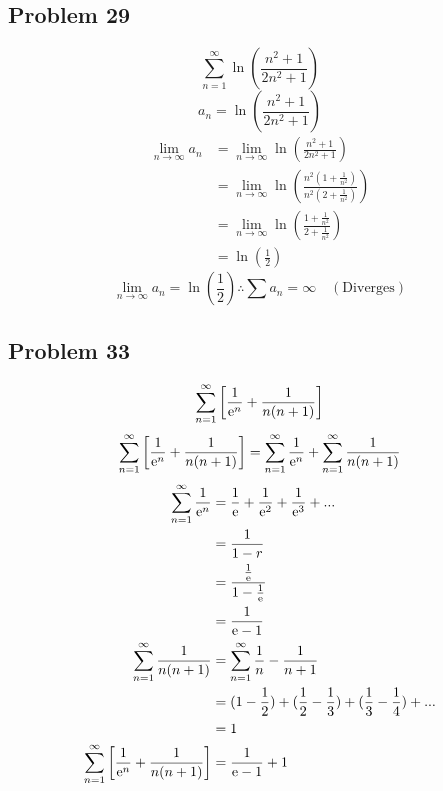 \documentclass[letterpaper, 12pt]{math}
\begin{document}
\subsection*{Problem 29}
\[ \sum_{n=1}^{\infty}\ln(\frac{n^{2}+1}{2n^{2}+1}) \]
\[ a_{n} = \ln(\frac{n^{2}+1}{2n^{2}+1}) \]
\begin{align*}
  \lim_{n\to\infty}a_{n} &= \lim_{n\to\infty}\ln(\frac{n^{2}+1}{2n^{2}+1}) \\
  &= \lim_{n\to\infty}
    \ln(\frac{n^{2}(1+\frac{1}{n^{2}})}{n^{2}(2+\frac{1}{n^{2}})}) \\
  &= \lim_{n\to\infty}
    \ln(\frac{1+\frac{1}{n^{2}}}{2+\frac{1}{n^{2}}}) \\
  &= \ln(\frac{1}{2})
\end{align*}
\[ \lim_{n\to\infty}a_{n} = \ln(\frac{1}{2}) \therefore
   \sum{a_{n}} = \infty \quad \mathrm{(Diverges)} \]

\subsection*{Problem 33}
\[ \sum_{n=1}^{\infty}\bigg[\frac{1}{\mathrm{e}^{n}}+\frac{1}{n(n+1)}\bigg] \]
\[ \sum_{n=1}^{\infty}\bigg[\frac{1}{\mathrm{e}^{n}}+\frac{1}{n(n+1)}\bigg] =
   \sum_{n=1}^{\infty}\frac{1}{\mathrm{e}^{n}}+\sum_{n=1}^{\infty}\frac{1}{n(n+1)} \]
\begin{align*}
  \sum_{n=1}^{\infty}\frac{1}{\mathrm{e}^{n}} &=
    \frac{1}{\mathrm{e}}+\frac{1}{\mathrm{e}^{2}}+\frac{1}{\mathrm{e}^{3}}+... \\
  &= \frac{1}{1-r} \\
  &= \frac{\frac{1}{\mathrm{e}}}{1-\frac{1}{\mathrm{e}}} \\
  &= \frac{1}{\mathrm{e}-1} \\
  \sum_{n=1}^{\infty}\frac{1}{n(n+1)} &=
    \sum_{n=1}^{\infty}\frac{1}{n}-\frac{1}{n+1} \\
  &= (1-\frac{1}{2})+(\frac{1}{2}-\frac{1}{3})+(\frac{1}{3}-\frac{1}{4})+... \\
  &= 1 \\
  \sum_{n=1}^{\infty}\bigg[\frac{1}{\mathrm{e}^{n}}+\frac{1}{n(n+1)}\bigg] &=
    \frac{1}{\mathrm{e}-1}+1
\end{align*}
\end{document}
